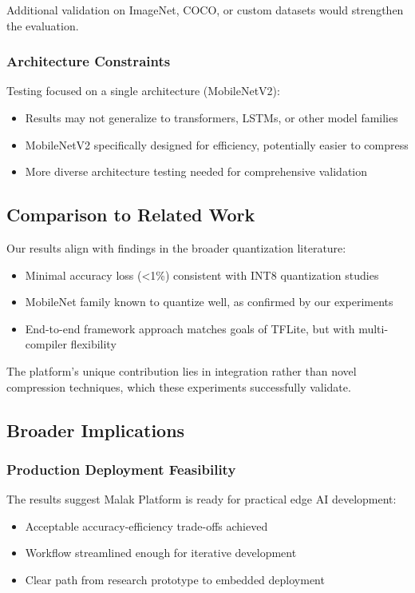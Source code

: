 Additional validation on ImageNet, COCO, or custom datasets would strengthen the evaluation.

\subsubsection{Architecture Constraints}
Testing focused on a single architecture (MobileNetV2):
\begin{itemize}
\item Results may not generalize to transformers, LSTMs, or other model families
\item MobileNetV2 specifically designed for efficiency, potentially easier to compress
\item More diverse architecture testing needed for comprehensive validation
\end{itemize}

\subsection{Comparison to Related Work}

Our results align with findings in the broader quantization literature:
\begin{itemize}
\item Minimal accuracy loss (<1\%) consistent with INT8 quantization studies
\item MobileNet family known to quantize well, as confirmed by our experiments
\item End-to-end framework approach matches goals of TFLite, but with multi-compiler flexibility
\end{itemize}

The platform's unique contribution lies in integration rather than novel compression techniques, which these experiments successfully validate.

\subsection{Broader Implications}

\subsubsection{Production Deployment Feasibility}
The results suggest Malak Platform is ready for practical edge AI development:
\begin{itemize}
\item Acceptable accuracy-efficiency trade-offs achieved
\item Workflow streamlined enough for iterative development
\item Clear path from research prototype to embedded deployment
\end{itemize}

